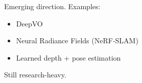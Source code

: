 \documentclass[a4paper]{article}
\title{}
\date{}
\begin{document}
    \maketitle
    Emerging direction.
    Examples:
    \begin{itemize}
    
        \item DeepVO
        \item Neural Radiance Fields (NeRF-SLAM)
        \item Learned depth + pose estimation
    \end{itemize}
    
    Still research-heavy.
\end{document}
